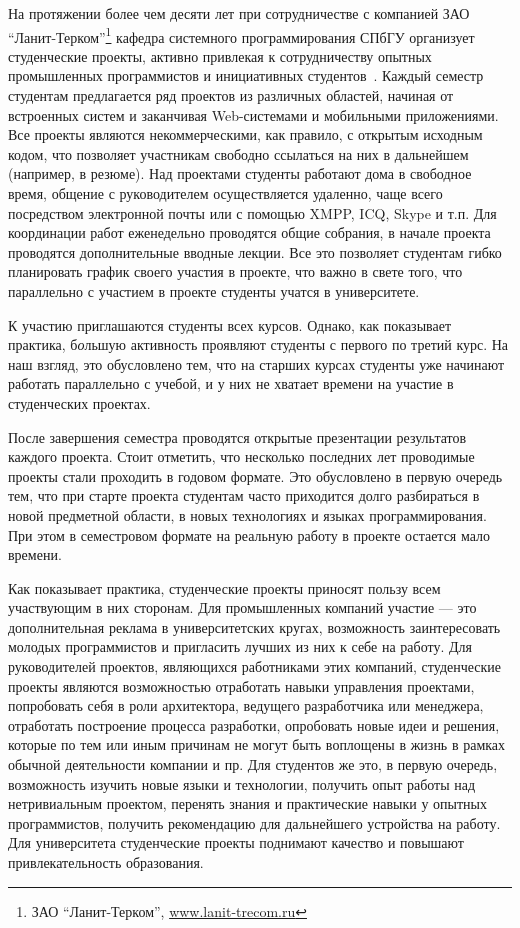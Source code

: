 \documentclass[a4paper]{article}
\begin{document}
На протяжении более чем десяти лет при сотрудничестве с компанией ЗАО ``Ланит-Терком''\footnote{ЗАО ``Ланит-Терком'', \url{www.lanit-trecom.ru}} кафедра системного программирования СПбГУ организует студенческие проекты, активно привлекая к сотрудничеству опытных промышленных программистов и инициативных студентов~\cite{gagarsky, saratov, terekhov3}. Каждый семестр студентам предлагается ряд проектов из различных областей, начиная от встроенных систем и заканчивая Web-системами и мобильными приложениями. Все проекты являются некоммерческими, как правило, с открытым исходным кодом, что позволяет участникам свободно ссылаться на них  в дальнейшем (например, в резюме). Над проектами студенты работают дома в свободное время, общение с руководителем осуществляется удаленно, чаще всего посредством электронной почты или с помощью XMPP, ICQ, Skype и т.п. Для координации работ еженедельно проводятся общие собрания, в начале проекта проводятся дополнительные вводные лекции. Все это позволяет студентам гибко планировать график своего участия в проекте, что важно в свете того, что параллельно с участием в проекте студенты учатся в университете. 

К участию приглашаются студенты всех курсов. Однако, как показывает практика, б\textit{о}льшую активность проявляют студенты с первого по третий курс. На наш взгляд, это обусловлено тем, что на старших курсах студенты уже начинают работать параллельно с учебой, и у них не хватает времени на участие в студенческих проектах. 

После завершения семестра проводятся открытые презентации результатов каждого проекта. Стоит отметить, что несколько последних лет проводимые проекты стали проходить в годовом формате. Это обусловлено в первую очередь тем, что при старте проекта студентам часто приходится долго разбираться в новой предметной области, в новых технологиях и языках программирования. При этом в семестровом формате на реальную работу в проекте остается мало времени. 

Как показывает практика, студенческие проекты приносят пользу всем участвующим в них сторонам. Для промышленных компаний участие --- это дополнительная реклама в университетских кругах, возможность заинтересовать молодых программистов и пригласить лучших из них к себе на работу. Для руководителей проектов, являющихся работниками этих компаний, студенческие проекты являются возможностью отработать навыки управления проектами, попробовать себя в роли архитектора, ведущего разработчика или менеджера, отработать построение процесса разработки, опробовать новые идеи и решения, которые по тем или иным причинам не могут быть воплощены в жизнь в рамках обычной деятельности компании и пр. Для студентов же это, в первую очередь, возможность изучить новые языки и технологии, получить опыт работы над нетривиальным проектом, перенять знания и практические навыки у опытных программистов, получить рекомендацию для дальнейшего устройства на работу. Для университета студенческие проекты поднимают качество и повышают привлекательность образования.   
\end{document}
